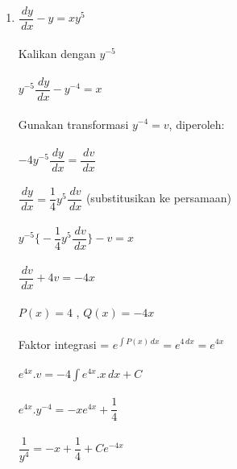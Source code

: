 \begin{enumerate}[1.]

	\item \begin{math} \dfrac{\, dy}{\, dx} - y = xy^{5} \end{math} \\ \\
	Kalikan dengan \begin{math} y^{-5} \end{math} \\ \\
	\begin{math} y^{-5} \dfrac{\, dy}{\, dx} - y^{-4} = x \end{math} \\ \\
	Gunakan transformasi \begin{math} y^{-4} = v \end{math}, diperoleh: \\ \\
	\begin{math} -4y^{-5} \dfrac{\, dy}{\, dx} = \dfrac{\, dv}{\, dx} \end{math} \\ \\
	\begin{math} \dfrac{\, dy}{\, dx} = \dfrac{1}{4} y^{5} \dfrac{\, dv}{\, dx} \end{math} (substitusikan ke persamaan) \\ \\ 
	\begin{math} y^{-5} \bigg\{ -\dfrac{1}{4}y^{5} \dfrac{\, dv}{\, dx} \bigg\} - v = x  \end{math} \\ \\
	\begin{math} \dfrac{\, dv}{\, dx} + 4v = -4x \end{math} \\ \\
	\begin{math} P(x) = 4 \end{math} , \begin{math} Q(x) = -4x \end{math} \\ \\
	Faktor integrasi = \begin{math} e^{\int P(x) \, dx} = e^{4 \, dx} = e^{4x} \end{math} \\ \\
	\begin{math} e^{4x}.v = -4 \int e^{4x}.x \, dx + C \end{math} \\ \\
	\begin{math} e^{4x}.y^{-4} = -xe^{4x} + \dfrac{1}{4} \end{math} \\ \\
	\begin{math} \dfrac{1}{y^{4}} = -x + \dfrac{1}{4} + Ce^{-4x} \end{math}


\end{enumerate}
